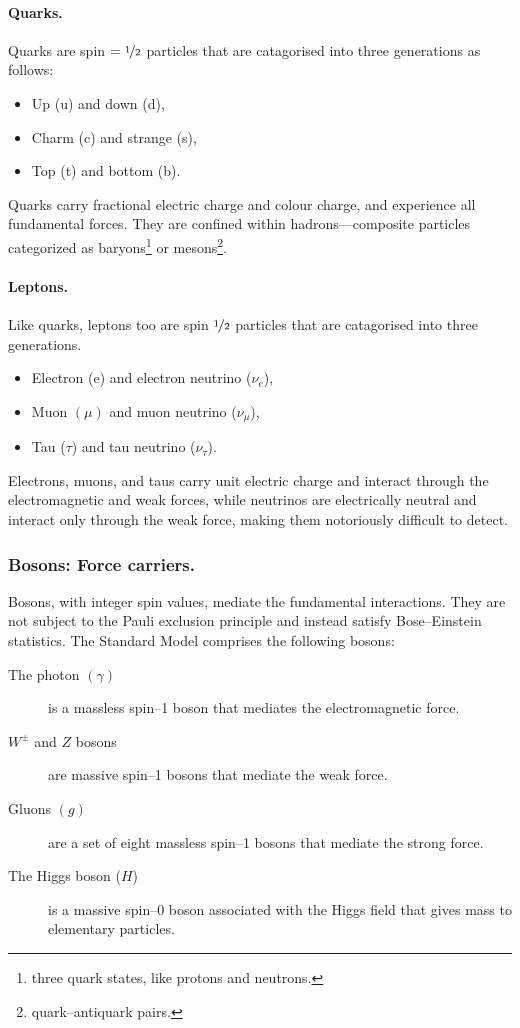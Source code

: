 \paragraph{Quarks.}
Quarks are spin $ = \nicefrac{1}{2}$ particles that are catagorised into three generations as follows:
\begin{itemize}
    \item Up (u) and down (d),
    \item Charm (c) and strange (s),
    \item Top (t) and bottom (b).
\end{itemize}

Quarks carry fractional electric charge and colour charge, and experience all fundamental forces.
%
They are confined within hadrons---composite particles categorized as baryons\footnote{three quark states, like protons and neutrons.} or mesons\footnote{quark--antiquark pairs.}.

\paragraph{Leptons.}
Like quarks, leptons too are spin \(\nicefrac12\) particles that are catagorised into three generations.
\begin{itemize}
    \item Electron (e) and electron neutrino ($\nu_e$),
    \item Muon $(\mu)$ and muon neutrino ($\nu_\mu$),
    \item Tau ($\tau$) and tau neutrino ($\nu_\tau$).
\end{itemize}

Electrons, muons, and taus carry unit electric charge and interact through the electromagnetic and weak forces, while neutrinos are electrically neutral and interact only through the weak force, making them notoriously difficult to detect.

\subsubsection{Bosons: Force carriers.}
Bosons, with integer spin values, mediate the fundamental interactions.
%
They are not subject to the Pauli exclusion principle and instead satisfy Bose--Einstein statistics.
%
The Standard Model comprises the following bosons:
\begin{description}
    \item [The photon $(\gamma)$] is a massless spin--1 boson that mediates the electromagnetic force.
    \item [$W^\pm$ and $Z$ bosons] are massive spin--1 bosons that mediate the weak force.
    \item [Gluons $(g)$] are a set of eight massless spin--1 bosons that mediate the strong force.
    \item [The Higgs boson ($H$)] is a massive spin--0 boson associated with the Higgs field that gives mass to elementary particles.
\end{description}

